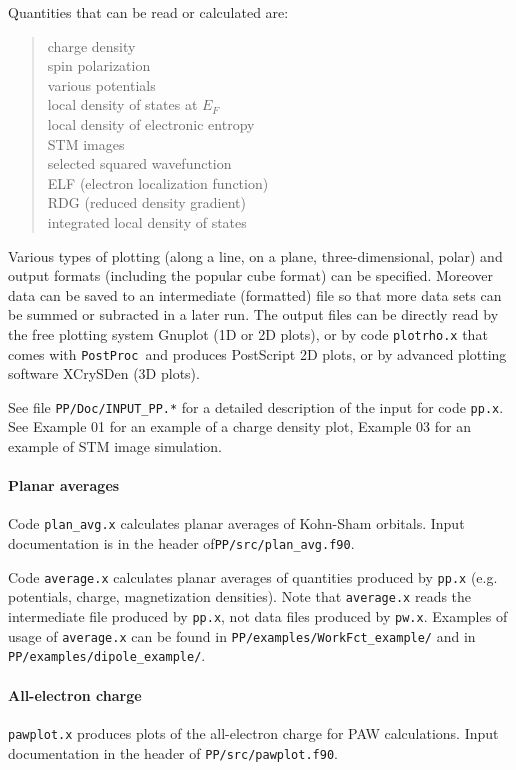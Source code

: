 \documentclass[12pt,a4paper]{article}
\def\pwx{\texttt{pw.x}}
\def\PostProc{\texttt{PostProc}}
\begin{document}
Quantities that can be read or calculated are:
\begin{quote}
      charge density\\
      spin polarization\\
      various potentials\\
      local density of states at $E_F$\\
      local density of electronic entropy\\
      STM images\\
      selected squared wavefunction\\
      ELF (electron localization function)\\
      RDG (reduced density gradient)\\
      integrated local density of states
\end{quote}
Various types of plotting (along a line, on a plane, three-dimensional, polar)
and output formats (including the popular cube format) can be specified.
Moreover data can be saved to an intermediate (formatted) file so that
more data sets can be summed or subracted in a later run.
The output files can be directly read by the free plotting system Gnuplot
(1D or 2D plots), or by code \texttt{plotrho.x} that comes with \PostProc\ 
and produces PostScript 2D plots,
or by advanced plotting software XCrySDen (3D plots).

See file \texttt{PP/Doc/INPUT\_PP.*} for a detailed description of the input
for code \texttt{pp.x}.
See Example 01 for an example of a charge density plot, Example 03
for an example of STM image simulation.

\paragraph{Planar averages}
Code \texttt{plan\_avg.x} calculates planar averages of Kohn-Sham orbitals.
Input documentation is in the header of\texttt{PP/src/plan\_avg.f90}.

Code \texttt{average.x} calculates planar averages of quantities produced
by \texttt{pp.x} (e.g. potentials, charge, magnetization densities).
Note that \texttt{average.x} reads the intermediate file produced
by \texttt{pp.x}, not data files produced by \pwx. Examples of usage 
of \texttt{average.x} can be found in \texttt{PP/examples/WorkFct\_example/} 
and in \texttt{PP/examples/dipole\_example/}.

\paragraph{All-electron charge}
\texttt{pawplot.x} produces plots of the all-electron charge
for PAW calculations. Input documentation in the header of
\texttt{PP/src/pawplot.f90}. 
\end{document}
